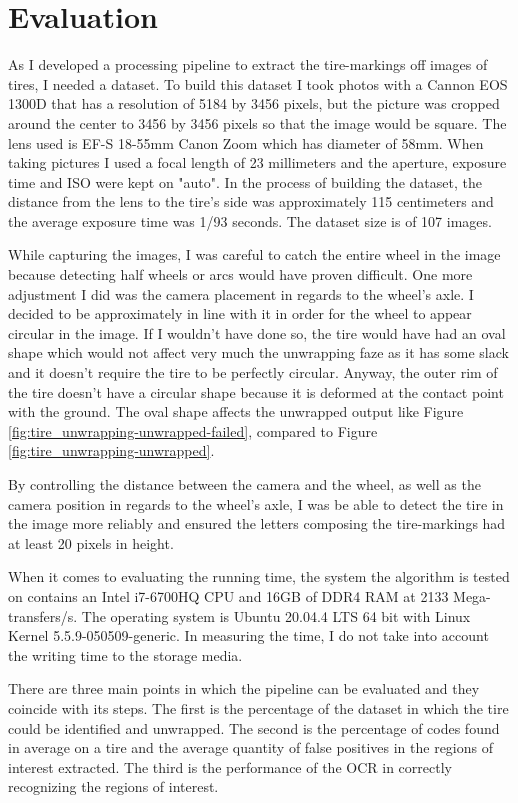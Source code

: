\chapter{Evaluation}\pagestyle{fancy}\setlength{\parindent}{3em}
\label{chap:evaluation}

As I developed a processing pipeline to extract the tire-markings off images of tires, I needed a dataset. To build this dataset I took photos with a Cannon EOS 1300D that has a resolution of 5184 by 3456 pixels, but the picture was cropped around the center to 3456 by 3456 pixels so that the image would be square. The lens used is EF-S 18-55mm Canon Zoom which has diameter of 58mm. When taking pictures I used a focal length of 23 millimeters and the aperture, exposure time and ISO were kept on "auto". In the process of building the dataset, the distance from the lens to the tire's side was approximately 115 centimeters and the average exposure time was 1/93 seconds. The dataset size is of 107 images.

While capturing the images, I was careful to catch the entire wheel in the image because detecting half wheels or arcs would have proven difficult. One more adjustment I did was the camera placement in regards to the wheel's axle. I decided to be approximately in line with it in order for the wheel to appear circular in the image. If I wouldn't have done so, the tire would have had an oval shape which would not affect very much the unwrapping faze as it has some slack and it doesn't require the tire to be perfectly circular. Anyway, the outer rim of the tire doesn't have a circular shape because it is deformed at the contact point with the ground. The oval shape affects the unwrapped output like Figure \ref{fig:tire_unwrapping-unwrapped-failed}, compared to Figure \ref{fig:tire_unwrapping-unwrapped}.

By controlling the distance between the camera and the wheel, as  well as the camera position in regards to the wheel's axle, I was be able to detect the tire in the image more reliably and ensured the letters composing the tire-markings had at least 20 pixels in height.

When it comes to evaluating the running time, the system the algorithm is tested on contains an Intel i7-6700HQ CPU and 16GB of DDR4 RAM at 2133 Mega-transfers/s. The operating system is Ubuntu 20.04.4 LTS 64 bit with Linux Kernel 5.5.9-050509-generic. In measuring the time, I do not take into account the writing time to the storage media.

There are three main points in which the pipeline can be evaluated and they coincide with its steps. The first is the percentage of the dataset in which the tire could be identified and unwrapped. The second is the percentage of codes found in average on a tire and the average quantity of false positives in the regions of interest extracted. The third is the performance of the OCR in correctly recognizing the regions of interest.

